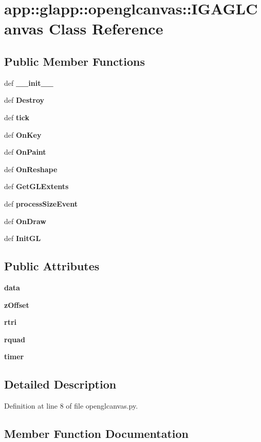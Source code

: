 \section{app::glapp::openglcanvas::IGAGLCanvas Class Reference}
\label{classapp_1_1glapp_1_1openglcanvas_1_1IGAGLCanvas}
\subsection*{Public Member Functions}
\begin{CompactItemize}
\item 
def {\bf \_\-\_\-init\_\-\_\-}
\item 
def {\bf Destroy}
\item 
def {\bf tick}
\item 
def {\bf OnKey}
\item 
def {\bf OnPaint}
\item 
def {\bf OnReshape}
\item 
def {\bf GetGLExtents}
\item 
def {\bf processSizeEvent}
\item 
def {\bf OnDraw}
\item 
def {\bf InitGL}
\end{CompactItemize}
\subsection*{Public Attributes}
\begin{CompactItemize}
\item 
{\bf data}
\item 
{\bf zOffset}
\item 
{\bf rtri}
\item 
{\bf rquad}
\item 
{\bf timer}
\end{CompactItemize}


\subsection{Detailed Description}


Definition at line 8 of file openglcanvas.py.

\subsection{Member Function Documentation}
